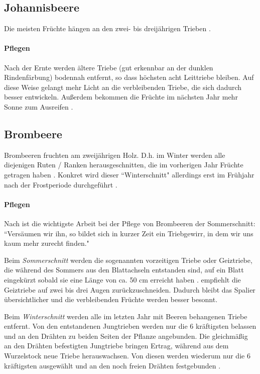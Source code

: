 \subsection{Johannisbeere}
\label{Johannisbeere}

Die meisten Früchte hängen an den zwei- bis dreijährigen Trieben \citep[S.~108]{Heberer2018}.

\paragraph{Pflegen}

Nach der Ernte werden ältere Triebe (gut erkennbar an der dunklen Rindenfärbung) bodennah entfernt, so dass höchsten acht Leittriebe bleiben.
Auf diese Weise gelangt mehr Licht an die verbleibenden Triebe, die sich dadurch besser entwickeln.
Außerdem bekommen die Früchte im nächsten Jahr mehr Sonne zum Ausreifen \citep[S.~108]{Heberer2018}.

\subsection{Brombeere}
\label{Brombeere}

Brombeeren fruchten am zweijährigen Holz.
D.h. im Winter werden alle diejenigen Ruten / Ranken herausgeschnitten, die im vorherigen Jahr Früchte getragen haben \citep[S.~176]{Seymour1978}.
Konkret wird dieser ``Winterschnitt" allerdings erst im Frühjahr nach der Frostperiode durchgeführt \citep[S.~196]{Stangl1995}.

\paragraph{Pflegen}

Nach \citet[S.~196]{Stangl1995} ist die wichtigste Arbeit bei der Pflege von Brombeeren der Sommerschnitt:
``Versäumen wir ihn, so bildet sich in kurzer Zeit ein Triebgewirr, in dem wir uns kaum mehr zurecht finden."

Beim \textit{Sommerschnitt} werden die sogenannten vorzeitigen Triebe oder Geiztriebe, die während des Sommers aus den Blattachseln entstanden sind, auf ein Blatt eingekürzt sobald sie eine Länge von ca. 50 cm erreicht haben \citep[S.~196]{Stangl1995}.
\citet[S.~108]{Heberer2018} empfiehlt die Geiztriebe auf zwei bis drei Augen zurückzuschneiden.
Dadurch bleibt das Spalier übersichtlicher und die verbleibenden Früchte werden besser besonnt.

Beim \textit{Winterschnitt} werden alle im letzten Jahr mit Beeren behangenen Triebe entfernt.
Von den entstandenen Jungtrieben werden nur die 6 kräftigsten belassen und an den Drähten zu beiden Seiten der Pflanze angebunden.
Die gleichmäßig an den Drähten befestigten Jungtriebe bringen Ertrag, während aus dem Wurzelstock neue Triebe herauswachsen.
Von diesen werden wiederum nur die 6 kräftigsten ausgewählt und an den noch freien Drähten festgebunden \citep[S.~197]{Stangl1995}.

